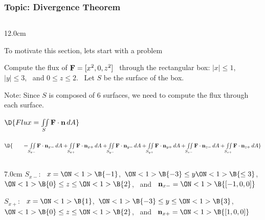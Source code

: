 \begin{frame}
\frametitle{Topic: Divergence Theorem}
\begin{columns}\begin{column}{12.0cm}

\scriptsize

\vspace{0.2cm}

To motivate this section, lets start with a problem

\vspace{0.2cm}

Compute the flux of ${\bf F} = [x^2,0,z^2]$ \, through the rectangular box: $|x| \le 1$, \, $|y| \le 3$, \, and $0 \le z \le 2$. \, Let $S$ be the surface of the box.

\vspace{0.2cm}

Note: Since $S$ is composed of 6 surfaces, we need to compute the flux through each surface.


\vspace{0.2cm}
 
$\D{Flux = \iint \limits_{S} {\bf F} \cdot {\bf n}\, dA}$

$\D{ \qquad = \iint \limits_{S_{x-}} {\bf F} \cdot {\bf n}_{x-}\, dA + \iint \limits_{S_{x+}} {\bf F} \cdot {\bf n}_{x+}\, dA + \iint \limits_{S_{y-}} {\bf F} \cdot {\bf n}_{y-}\, dA + \iint \limits_{S_{y+}} {\bf F} \cdot {\bf n}_{y+}\, dA + \iint \limits_{S_{z-}} {\bf F} \cdot {\bf n}_{z-}\, dA + \iint \limits_{S_{z+}} {\bf F} \cdot {\bf n}_{z+}\, dA}$

\vspace{0.2cm}

\begin{columns}
\begin{column}{7.0cm}
	$S_{x-}$: \, 
	$x=\ON<1>{\B{-1}}$,\, 
	$\ON<1>{\B{-3}} \le y 
	\ON<1>{\B{\le 3}}$,\, 
	$\ON<1>{\B{0}} \le z \le 
	\ON<1>{\B{2}}$, \, and \, ${\bf n}_{x-} = 
	\ON<1>{\B{[-1,0,0]}}$
	
	\vspace{0.4cm}
	
	$S_{x+}$: \, 
	$x=\ON<1>{\B{1}}$,\, 
	$\ON<1>{\B{-3}} \le y \le 
	\ON<1>{\B{3}}$,\, 
	$\ON<1>{\B{0}} \le z \le 
	\ON<1>{\B{2}}$, \, and \, ${\bf n}_{x+} = 
	\ON<1>{\B{[1,0,0]}}$
	
	\vspace{0.4cm}
	

\end{column}
\end{columns}
\end{column}
\end{columns}
\end{frame}

